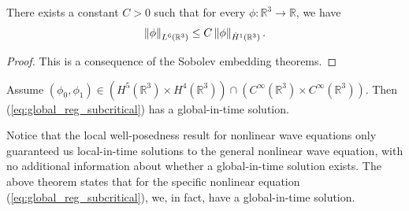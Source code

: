 \documentclass{article}
\begin{document}
\begin{prop}
	There exists a constant $C > 0$ such that for every $\phi: \mathbb{R}^{3} \to \mathbb{R}$, we have $$\left\Vert \phi \right\Vert_{L^{6}(\mathbb{R}^{3})} \leq C\left\Vert \phi \right\Vert_{\dot{H}^{1}(\mathbb{R}^{3})}.$$  
\end{prop} 
\begin{proof}
	This is a consequence of the Sobolev embedding theorems. 
\end{proof} 
\begin{theorem}
	Assume $(\phi_{0}, \phi_{1}) \in (H^{5}(\mathbb{R}^{3}) \times H^{4}(\mathbb{R}^{3}))\cap (C^{\infty}(\mathbb{R}^{3}) \times C^{\infty}(\mathbb{R}^{3}))$. Then (\ref{eq:global_reg_subcritical}) has a global-in-time solution. 
\end{theorem}
\begin{remark}
	Notice that the local well-posedness result for nonlinear wave equations only guaranteed us local-in-time solutions to the general nonlinear wave equation, with no additional information about whether a global-in-time solution exists. The above theorem states that for the specific nonlinear equation (\ref{eq:global_reg_subcritical}), we, in fact, have a global-in-time solution. 
\end{remark} 
\end{document}
